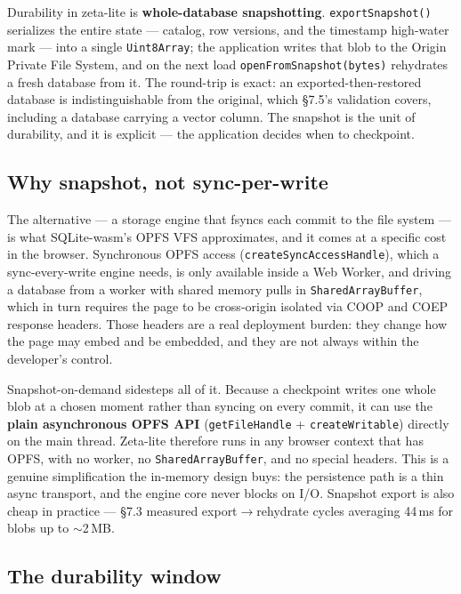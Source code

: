 \documentclass[11pt]{article}
\begin{document}
Durability in zeta-lite is \textbf{whole-database snapshotting}.
\texttt{exportSnapshot()} serializes the entire state --- catalog, row versions, and
the timestamp high-water mark --- into a single \texttt{Uint8Array}; the application
writes that blob to the Origin Private File System, and on the next load
\texttt{openFromSnapshot(bytes)} rehydrates a fresh database from it. The round-trip
is exact: an exported-then-restored database is indistinguishable from the original,
which \S7.5's validation covers, including a database carrying a vector column. The
snapshot is the unit of durability, and it is explicit --- the application decides
when to checkpoint.

\subsection{Why snapshot, not sync-per-write}

The alternative --- a storage engine that fsyncs each commit to the file system ---
is what SQLite-wasm's OPFS VFS approximates, and it comes at a specific cost in the
browser. Synchronous OPFS access (\texttt{createSyncAccessHandle}), which a
sync-every-write engine needs, is only available inside a Web Worker, and driving a
database from a worker with shared memory pulls in \texttt{SharedArrayBuffer}, which
in turn requires the page to be cross-origin isolated via COOP and COEP response
headers. Those headers are a real deployment burden: they change how the page may
embed and be embedded, and they are not always within the developer's control.

Snapshot-on-demand sidesteps all of it. Because a checkpoint writes one whole blob
at a chosen moment rather than syncing on every commit, it can use the \textbf{plain
asynchronous OPFS API} (\texttt{getFileHandle} + \texttt{createWritable}) directly
on the main thread. Zeta-lite therefore runs in any browser context that has OPFS,
with no worker, no \texttt{SharedArrayBuffer}, and no special headers. This is a
genuine simplification the in-memory design buys: the persistence path is a thin
async transport, and the engine core never blocks on I/O. Snapshot export is also
cheap in practice --- \S7.3 measured export$\rightarrow$rehydrate cycles averaging
44\,ms for blobs up to $\sim$2\,MB.

\subsection{The durability window}
\end{document}
